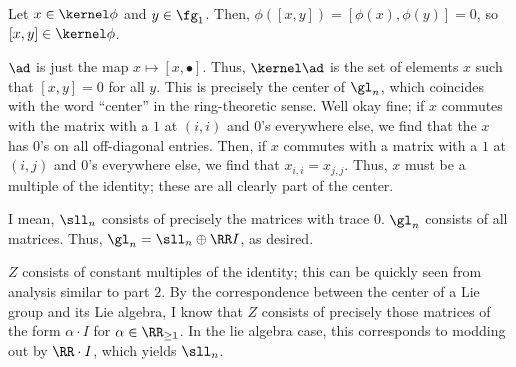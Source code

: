 \documentclass[11pt, headheight=30pt]{scrartcl}
\begin{document}
\begin{psec*}
    [Part 1]
\end{psec*}
Let $x\in \kernel \phi$ and $y\in \fg_1$.
Then, $\phi([x, y]) = [\phi(x), \phi(y)] = 0$, so $[x, y]\in \kernel \phi$.

\begin{psec*}
    [Part 2]
\end{psec*}
$\ad$ is just the map $x\mapsto [x, \bullet]$. Thus, $\kernel \ad$ is the set
of elements $x$ such that $[x, y] = 0$ for all $y$. This is precisely the center
of $\gl_n$, which coincides with the word ``center'' in the ring-theoretic sense.
Well okay fine; if $x$ commutes with the matrix with a $1$ at $(i,i)$ and $0$'s
everywhere else, we find that the $x$ has $0$'s on all off-diagonal entries.
Then, if $x$ commutes with a matrix with a $1$ at $(i,j)$ and $0$'s everywhere
else, we find that $x_{i,i} = x_{j,j}$. Thus, $x$ must be a multiple of the identity;
these are all clearly part of the center.

\begin{psec*}
    [Part 3]
\end{psec*}
I mean, $\sll_n$ consists of precisely the matrices with trace $0$. $\gl_n$
consists of all matrices. Thus, $\gl_n = \sll_n \oplus \RR I$, as desired.

\begin{psec*}
    [Part 4]
\end{psec*}
$Z$ consists of constant multiples of the identity; this can be quickly
seen from analysis similar to part $2$. 
By the correspondence between the center of a Lie group and its Lie algebra,
I know that $Z$ consists of precisely those matrices of the form $\alpha \cdot I$
for $\alpha\in \RR_{\geq 1}$. In the lie algebra case, this corresponds
to modding out by $\RR \cdot I$, which yields $\sll_n$.
\end{document}
